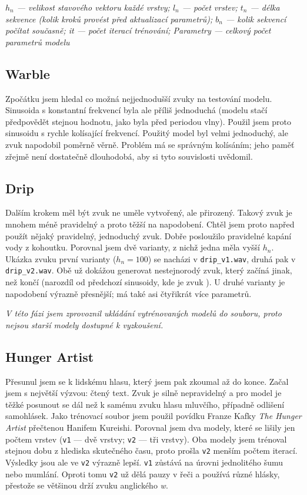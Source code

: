 \documentclass[a4]{article}
\begin{document}
\textit{$h_n$ --- velikost stavového vektoru každé vrstvy; $l_n$ --- počet vrstev; $t_n$ --- délka \textit{sekvence} (kolik kroků provést před aktualizací parametrů); $b_n$ --- kolik sekvencí počítat současně; it --- počet iterací trénování; Parametry --- celkový počet parametrů modelu}
\subsection{Warble}
Zpočátku jsem hledal co možná nejjednodušší zvuky na testování modelu. Sinusoida s konstantní frekvencí byla ale příliš jednoduchá (modelu stačí předpovědět stejnou hodnotu, jako byla před periodou vlny). Použil jsem proto sinusoidu s rychle kolísající frekvencí. Použitý model byl velmi jednoduchý, ale zvuk napodobil poměrně věrně. Problém má se správným kolísáním; jeho paměť zřejmě není dostatečně dlouhodobá, aby si tyto souvislosti uvědomil.

\subsection{Drip}
Dalším krokem měl být zvuk ne uměle vytvořený, ale přirozený. Takový zvuk je mnohem méně pravidelný a proto těžší na napodobení. Chtěl jsem proto napřed použít nějaký pravidelný, jednoduchý zvuk. Dobře posloužilo pravidelné kapání vody z kohoutku. Porovnal jsem dvě varianty, z nichž jedna měla vyšší $h_n$. Ukázka zvuku první varianty ($h_n=100$) se nacházi v \verb|drip_v1.wav|, druhá pak v \verb|drip_v2.wav|. Obě už dokážou generovat nestejnorodý zvuk, který začíná jinak, než končí (narozdíl od předchozí sinusoidy, kde je zvuk ). U druhé varianty je napodobení výrazně přesnější; má také asi čtyřikrát více parametrů.

\textit{V této fázi jsem zprovoznil ukládání vytrénovaných modelů do souboru, proto nejsou starší modely dostupné k vyzkoušení.}
\subsection{Hunger Artist}
Přesunul jsem se k lidskému hlasu, který jsem pak zkoumal až do konce. Začal jsem s největší výzvou: čtený text. Zvuk je silně nepravidelný a pro model je těžké posunout se dál než k samému zvuku hlasu mluvčího, případně odlišení samohlásek. Jako trénovací soubor jsem použil povídku Franze Kafky \textit{The Hunger Artist} přečtenou Hanifem Kureishi. %
Porovnal jsem dva modely, které se lišily jen počtem vrstev (\verb|v1| --- dvě vrstvy; \verb|v2| --- tři vrstvy). Oba modely jsem trénoval stejnou dobu z hlediska skutečného času, proto prošla \verb|v2| menším počtem iterací. Výsledky jsou ale ve \verb|v2| výrazně lepší. \verb|v1| zůstává na úrovni jednolitého šumu nebo mumlání. Oproti tomu \verb|v2| už dělá pauzy v řeči a používá různé hlásky, přestože se většinou drží zvuku anglického \textit{w}.
\end{document}
